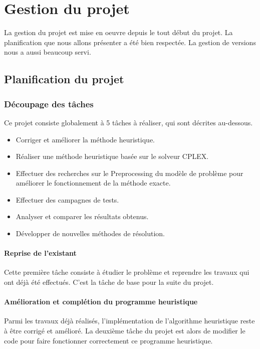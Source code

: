 \chapter{Gestion du projet}
La gestion du projet est mise en oeuvre depuis le tout début du projet. La planification que nous allons présenter a été bien respectée. La gestion de versions nous a aussi beaucoup servi.

\section{Planification du projet}
\subsection{Découpage des tâches}%
Ce projet consiste globalement à 5 tâches à réaliser, qui sont décrites au-dessous.
\bigskip
\begin{itemize}
	\item Corriger et améliorer la méthode heuristique.
	\item Réaliser une méthode heuristique basée sur le solveur CPLEX.
	\item Effectuer des recherches sur le Preprocessing du modèle de problème pour améliorer le fonctionnement de la méthode exacte.
	\item Effectuer des campagnes de tests.
	\item Analyser et comparer les résultats obtenus.
	\item Développer de nouvelles méthodes de résolution.
\end{itemize}
\bigskip

\subsubsection{Reprise de l'existant}
Cette première tâche consiste à étudier le problème et reprendre les travaux qui ont déjà été effectués. C'est la tâche de base pour la suite du projet.

\subsubsection{Amélioration et complétion du programme heuristique}
Parmi les travaux déjà réalisés, l'implémentation de l'algorithme heuristique reste à être corrigé et amélioré. La deuxième tâche du projet est alors de modifier le code pour faire fonctionner correctement ce programme heuristique.

